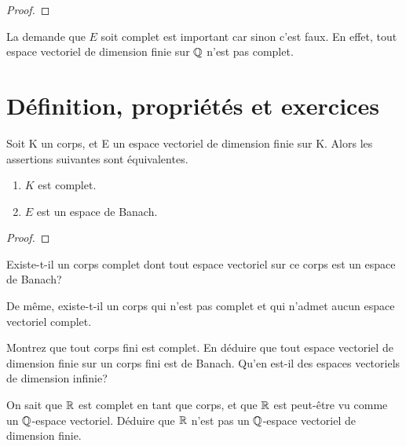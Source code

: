 \ifdefined\outputproof
\begin{proof}

\end{proof}
\fi

\begin{remarque}
	La demande que $E$ soit complet est important car sinon c'est faux. En
	effet, tout espace vectoriel de dimension finie sur $\mathbb{Q}$ n'est pas
	complet.
\end{remarque}

\section{Définition, propriétés et exercices}


\begin{proposition}
	Soit K un corps, et E un espace vectoriel de dimension finie sur K. Alors
	les assertions suivantes sont équivalentes.
	\begin{enumerate}
		\item $K$ est complet.
		\item $E$ est un espace de Banach.
	\end{enumerate}
\end{proposition}

\ifdefined\outputproof
\begin{proof}

\end{proof}
\fi

\begin{question}
	Existe-t-il un corps complet dont tout espace vectoriel sur ce corps est un
	espace de Banach?

	De même, existe-t-il un corps qui n'est pas complet et qui n'admet aucun
	espace vectoriel complet.
\end{question}

\begin{exercice}
	Montrez que tout corps fini est complet. En déduire que tout espace
	vectoriel de dimension finie sur un corps fini est de Banach. Qu'en est-il
	des espaces vectoriels de dimension infinie?
\end{exercice}

\begin{exercice}
	On sait que $\mathbb{R}$ est complet en tant que corps, et que $\mathbb{R}$ est
	peut-être vu comme un $\mathbb{Q}$-espace vectoriel. Déduire que $\mathbb{R}$
	n'est pas un $\mathbb{Q}$-espace vectoriel de dimension finie.
\end{exercice}

